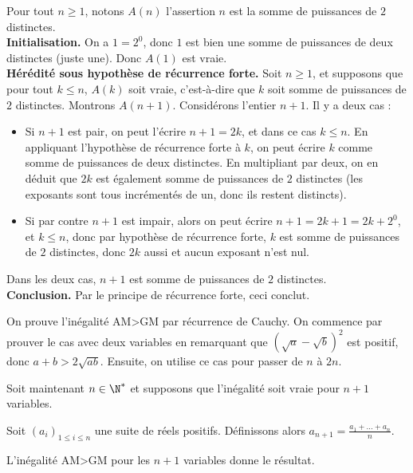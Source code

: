 \begin{Soln}{44}
Pour tout $n\geq 1$, notons $A(n)$ l'assertion \og $n$ est la somme de puissances de $2$ distinctes.\fg\\

\textbf{Initialisation.} On a $1 = 2^0$, donc $1$ est bien une somme de puissances de deux distinctes (juste une). Donc $A(1)$ est vraie.\\

\textbf{Hérédité sous hypothèse de récurrence forte.} Soit $n\geq 1$, et supposons que pour tout $k\leq n$, $A(k)$ soit vraie, c'est-à-dire que $k$ soit somme de puissances de $2$ distinctes.  Montrons $A(n+1)$. Considérons l'entier $n+1$. Il y a deux cas :
\begin{itemize}
\item Si $n+1$ est pair, on peut l'écrire $n+1=2k$, et dans ce cas $k\leq n$. En appliquant l'hypothèse de récurrence forte à $k$, on peut écrire $k$ comme somme de puissances de deux distinctes. En multipliant par deux, on en déduit que $2k$ est également somme de puissances de $2$ distinctes (les exposants sont tous incrémentés de un, donc ils restent distincts).
\item Si par contre $n+1$ est impair, alors on peut écrire $n+1 = 2k+1 = 2k+2^0$, et $k\leq n$, donc par hypothèse de récurrence forte, $k$ est somme de puissances de $2$ distinctes, donc $2k$ aussi et aucun exposant n'est nul.
\end{itemize}
Dans les deux cas, $n+1$ est somme de puissances de $2$ distinctes.\\
\textbf{Conclusion.} Par le principe de récurrence forte, ceci conclut.
\end{Soln}
\begin{Soln}{45}
On prouve l'inégalité AM>GM par récurrence de Cauchy. On commence par prouver le cas avec deux variables en remarquant que $(\sqrt a - \sqrt b)^2$ est positif, donc $a+b > 2\sqrt {ab}$. Ensuite, on utilise ce cas pour passer de $n$ à $2n$.

Soit maintenant $n \in \N^*$ et supposons que l'inégalité soit vraie pour $n+1$ variables.

Soit $(a_i)_{1\leq i\leq n}$ une suite de réels positifs. Définissons alors $a_{n+1} = \frac{a_1+...+a_n}{n}$.

L'inégalité AM>GM pour les $n+1$ variables donne le résultat.
\end{Soln}
